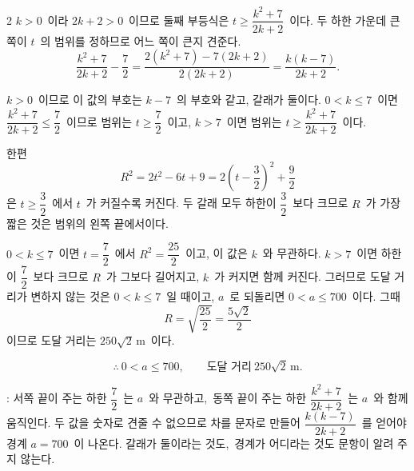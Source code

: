 \documentclass[10pt,fleqn]{article}
\begin{document}
\begin{multicols*}{2}
$k>0$\ 이라 $2k+2>0$\ 이므로 둘째 부등식은 $t\ge\dfrac{k^{2}+7}{2k+2}$\ 이다. 두 하한 가운데 큰 쪽이 $t$\ 의 범위를 정하므로 어느 쪽이 큰지 견준다.
$$\dfrac{k^{2}+7}{2k+2}-\dfrac72=\dfrac{2(k^{2}+7)-7(2k+2)}{2(2k+2)}=\dfrac{k(k-7)}{2k+2}.$$

$k>0$\ 이므로 이 값의 부호는 $k-7$\ 의 부호와 같고, 갈래가 둘이다. $0<k\le 7$\ 이면 $\dfrac{k^{2}+7}{2k+2}\le\dfrac72$\ 이므로 범위는 $t\ge\dfrac72$\ 이고, $k>7$\ 이면 범위는 $t\ge\dfrac{k^{2}+7}{2k+2}$\ 이다.

한편
$$R^{2}=2t^{2}-6t+9=2\left(t-\dfrac32\right)^{2}+\dfrac92$$
은 $t\ge\dfrac32$\ 에서 $t$\ 가 커질수록 커진다. 두 갈래 모두 하한이 $\dfrac32$\ 보다 크므로 $R$\ 가 가장 짧은 것은 범위의 왼쪽 끝에서이다.

$0<k\le 7$\ 이면 $t=\dfrac72$\ 에서 $R^{2}=\dfrac{25}{2}$\ 이고, 이 값은 $k$\ 와 무관하다. $k>7$\ 이면 하한이 $\dfrac72$\ 보다 크므로 $R$\ 가 그보다 길어지고, $k$\ 가 커지면 함께 커진다. 그러므로 도달 거리가 변하지 않는 것은 $0<k\le 7$\ 일 때이고, $a$\ 로 되돌리면 $0<a\le 700$\ 이다. 그때
$$R=\sqrt{\dfrac{25}{2}}=\dfrac{5\sqrt2}{2}$$
이므로 도달 거리는 $250\sqrt2\,\mathrm{m}$\ 이다.

$$\therefore\ 0<a\le 700,\qquad \text{도달 거리}\ 250\sqrt2\,\mathrm{m}.$$

\begin{dmcriticalpoint}
: 서쪽 끝이 주는 하한 $\dfrac72$\ 는 $a$\ 와 무관하고,\ 동쪽 끝이 주는 하한 $\dfrac{k^{2}+7}{2k+2}$\ 는 $a$\ 와 함께 움직인다. 두 값을 숫자로 견줄 수 없으므로 차를 문자로 만들어 $\dfrac{k(k-7)}{2k+2}$\ 를 얻어야 경계 $a=700$\ 이 나온다. 갈래가 둘이라는 것도,\ 경계가 어디라는 것도 문항이 알려 주지 않는다.
\end{dmcriticalpoint}

\end{multicols*}
\end{document}
